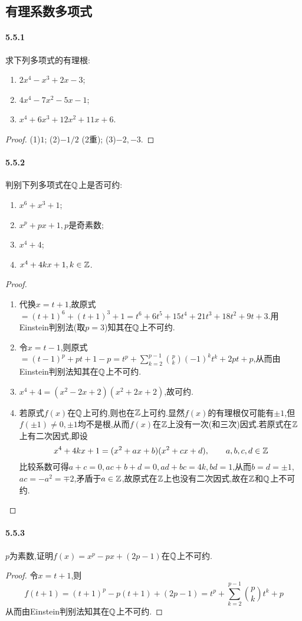\documentclass[11pt]{article}
\begin{document}
\newpage
\subsection{有理系数多项式}
\paragraph{5.5.1}求下列多项式的有理根:
\begin{enumerate}
    \item $2x^4-x^3+2x-3$;
    \item $4x^4-7x^2-5x-1$;
    \item $x^4+6x^3+12x^2+11x+6$.
\end{enumerate}
\begin{proof}
    (1)$1$; (2)$-1/2$ (2重); (3)$-2, -3$.
\end{proof}
\paragraph{5.5.2}判别下列多项式在$\mathbb{Q}$上是否可约:
\begin{enumerate}
    \item $x^6+x^3+1$;
    \item $x^p+px+1, p$是奇素数;
    \item $x^4+4$;
    \item $x^4+4kx+1, k\in \mathbb{Z}$.
\end{enumerate}
\begin{proof}
    \begin{enumerate}
        \item 代换$x=t+1$,故原式$=(t+1)^6+(t+1)^3+1=t^6+6 t^5+15 t^4+21 t^3+18 t^2+9 t+3$.用Einstein判别法(取$p=3$)知其在$\mathbb{Q}$上不可约.
        \item 令$x=t-1$,则原式$=(t-1)^p+pt+1-p=t^p+\sum_{k=2}^{p-1}\binom{p}{k}(-1)^{k}t^k+2pt+p$,从而由Einstein判别法知其在$\mathbb{Q}$上不可约.
        \item $x^4+4=(x^2-2x+2)(x^2+2x+2)$,故可约.
        \item 若原式$f(x)$在$\mathbb{Q}$上可约,则也在$\mathbb{Z}$上可约.显然$f(x)$的有理根仅可能有$\pm 1$,但$f(\pm 1)\neq 0, \pm 1$均不是根,从而$f(x)$在$\mathbb{Z}$上没有一次(和三次)因式.若原式在$\mathbb{Z}$上有二次因式,即设
        $$x^4+4kx+1=(x^2+ax+b)(x^2+cx+d), \qquad a,b,c,d\in\mathbb{Z}$$
        比较系数可得$a+c=0, ac+b+d=0, ad+bc=4k, bd=1$,从而$b=d=\pm 1$,$ac=-a^2=\mp 2$,矛盾于$a\in\mathbb{Z}$,故原式在$\mathbb{Z}$上也没有二次因式,故在$\mathbb{Z}$和$\mathbb{Q}$上不可约.
    \end{enumerate}
\end{proof}
\paragraph{5.5.3}$p$为素数,证明$f(x)=x^p-px+(2p-1)$在$\mathbb{Q}$上不可约.
\begin{proof}
    令$x=t+1$,则
    $$f(t+1)=(t+1)^p-p(t+1)+(2p-1)=t^p+\sum_{k=2}^{p-1}\binom{p}{k}t^k+p$$
    从而由Einstein判别法知其在$\mathbb{Q}$上不可约.
\end{proof}
\end{document}
